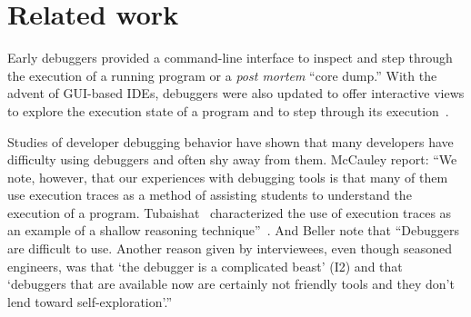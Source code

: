 \documentclass[sigplan,anonymous,review,10pt]{acmart}
\newcommand\on[1]{\nbc{ON}{#1}{olive}} %
\newcommand\ac[1]{\nbc{AC}{#1}{teal}}
\begin{document}

\section{Related work}\label{sec:related}

Early debuggers provided a command-line interface to inspect and step through the execution of a running program or a \emph{post mortem} ``core dump.''
With the advent of GUI-based IDEs, debuggers were also updated to offer interactive views to explore the execution state of a program and to step through its execution~\cite{Rose96a}.

Studies of developer debugging behavior have shown that many developers have difficulty using debuggers and often shy away from them.
McCauley \etal report:
``We note, however, that our experiences with debugging tools is that many of them use execution traces as a method of assisting students to understand the execution of a program. Tubaishat~\cite{Tuba01a} characterized the use of execution traces as an example of a shallow reasoning technique''~\cite{McCa08a}.
And Beller \etal note that
``Debuggers are difficult to use. Another reason given by interviewees, even though seasoned engineers, was that `the debugger is a complicated beast' (I2) and that `debuggers that are available now are certainly not friendly tools and they don't lend toward self-exploration'.''
\cite{Bell18a}
\end{document}
